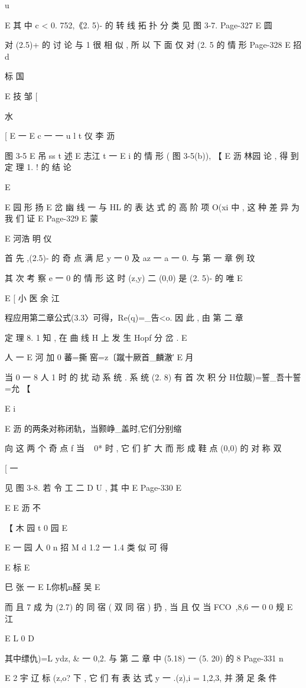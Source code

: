{{{{{{{{{{{{{{{{{{{u

E
其 中 c < 0. 752,《2. 5)- 的 转 线 拓 扑 分 类 见 图 3-7.
Page-327
E 圆

对 (2.5)+ 的 讨 论 与 1 很 相 似 , 所 以 下 面 仅 对 (2. 5 的 情 形
Page-328
E 招 d

标 国

E 技 邹
[

水

[
E 一
E
c
一 一
u l t 仪 李 沥

图 3-5
E 吊 ss t 述
E 志江 t 一
E i
的 情 形 ( 图 3-5(b)), 【
E 沥 林园
论 , 得 到 定 理 1. ! 的 结 论

E

E 园 形 扬
E
岔 幽 线 一 与 HL 的 表 达 式 的 高 阶 项 O(xi 中 , 这 种 差 异 为 我 们 证
E
Page-329
E 蒙

E 河浩 明 仪

首 先 ,(2.5)- 的 奇 点 满 尼 y 一 0 及 az 一 a 一 0. 与 第 一 章 例
玟

其 次 考 察 e 一 0 的 情 形 这 时 (z,y) 二 (0,0) 是 (2. 5)- 的 唯
E

E
[ 小
医 余 江

程应用第二章公式(3.3〉可得，Re(q)=_告<o. 因 此 , 由 第 二 章

定 理 8. 1 知 , 在 曲 线 H 上 发 生 Hopf 分 岔 .
E

人 一
E 河 加 0
蕃=撕 窑=z〔蹴十厥首_麟澈′
E 月

当 0 一 8 人 1 时 的 扰 动 系 统 . 系 统 (2. 8) 有 首 次 积 分
H位靓)=誓_吾十誓=允 【

E i

E 沥 的两条对称闭轨，当颢峥_盖时,它们分别缩

向 这 两 个 奇 点 f 当 ~ 0* 时 , 它 们 扩 大 而 形 成 鞋 点 (0,0) 的 对 称 双

[ 一

见 图 3-8. 若 令 工 二 D U , 其 中
E
Page-330
E

E
E 沥 不

【 木
园 t 0 园
E

E 一 园 人
0
n 招
M
d
1.2 一 1.4 类 似 可 得

E 标
E

巳 张 一
E L你机n醛 吴 E

而 且 7 成 为 (2.7) 的 同 宿 ( 双 同 宿 ) 扔 , 当 且 仅 当 FCO~,8,6 一 0
0 规
E 江

E L 0
D

其中缥仇)=L ydz, & 一 0,2. 与 第 二 章 中 (5.18) 一 (5. 20) 的
8
Page-331
n

E
2 宇 辽
标 (z,o? 下 , 它 们 有 表 达 式 y 一 .(z),i = 1,2,3, 并 漪 足 条 件

}}}}}}}}}}}}}}}}}}}
